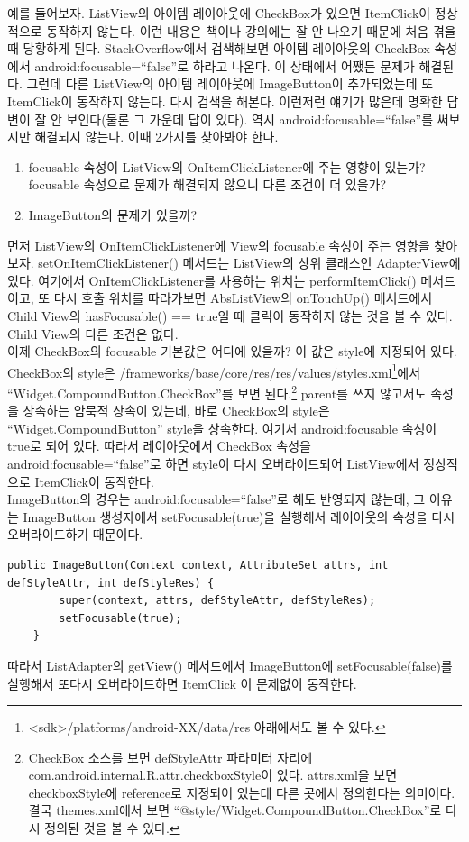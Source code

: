 예를 들어보자.
ListView의 아이템 레이아웃에 CheckBox가 있으면 ItemClick이 정상적으로 동작하지 않는다. 
이런 내용은 책이나 강의에는 잘 안 나오기 때문에 처음 겪을 때 당황하게 된다. 
StackOverflow에서 검색해보면 아이템 레이아웃의 CheckBox 속성에서 android:focusable=``false''로 하라고 나온다. 이 상태에서 어쨌든 문제가 해결된다.
그런데 다른 ListView의 아이템 레이아웃에 ImageButton이 추가되었는데 또 ItemClick이 동작하지 않는다. 다시 검색을 해본다. 
이런저런 얘기가 많은데 명확한 답변이 잘 안 보인다(물론 그 가운데 답이 있다). 역시 android:focusable=``false''를 써보지만 해결되지 않는다. 
이때 2가지를 찾아봐야 한다. 
\begin{enumerate}
\item focusable 속성이 ListView의 OnItemClickListener에 주는 영향이 있는가? focusable 속성으로 문제가 해결되지 않으니 다른 조건이 더 있을가?
\item ImageButton의 문제가 있을까?
\end{enumerate}

먼저 ListView의 OnItemClickListener에 View의 focusable 속성이 주는 영향을 찾아보자. 
setOnItemClickListener() 메서드는 ListView의 상위 클래스인 AdapterView에 있다. 
여기에서 OnItemClickListener를 사용하는 위치는 performItemClick() 메서드이고, 또 다시 호출 위치를 따라가보면 AbsListView의 onTouchUp() 메서드에서 Child View의 hasFocusable() == true일 때 클릭이 동작하지 않는 것을 볼 수 있다. Child View의 다른 조건은 없다.\\

이제 CheckBox의 focusable 기본값은 어디에 있을까? 이 값은 style에 지정되어 있다.
CheckBox의 style은 /frameworks/base/core/res/res/values/styles.xml\footnote{<sdk>/platforms/android-XX/data/res 아래에서도 볼 수 있다.}에서 ``Widget.CompoundButton.Chec\-kBox''를 보면 된다.\footnote{CheckBox 소스를 보면 defStyleAttr 파라미터 자리에 com.android.internal.R.attr.checkboxStyle이 있다. 
attrs.xml을 보면 checkboxStyle에 reference로 지정되어 있는데 다른 곳에서 정의한다는 의미이다. 
결국 themes.xml에서 보면 ``@style/Widget.CompoundButton.CheckBox''로 다시 정의된 것을 볼 수 있다.}
parent를 쓰지 않고서도 속성을 상속하는 암묵적 상속이 있는데, 바로 CheckBox의 style은 ``Widget.CompoundButton'' style을 상속한다. 
여기서 android:focusable 속성이 true로 되어 있다.
따라서 레이아웃에서 CheckBox 속성을 android:focusable=``false''로 하면 style이 다시 오버라이드되어 ListView에서 정상적으로 ItemClick이 동작한다.\\

ImageButton의 경우는 android:focusable=``false''로 해도 반영되지 않는데, 그 이유는 ImageButton 생성자에서 setFocusable(true)을 실행해서 레이아웃의 속성을 다시 오버라이드하기 때문이다. 
\begin{lstlisting}[frame=single]
    public ImageButton(Context context, AttributeSet attrs, int defStyleAttr, int defStyleRes) {
        super(context, attrs, defStyleAttr, defStyleRes);
        setFocusable(true);
    }
\end{lstlisting}
따라서 ListAdapter의 getView() 메서드에서 ImageButton에 setFocusable(false)를 실행해서 또다시 오버라이드하면 ItemClick 이 문제없이 동작한다.\\

